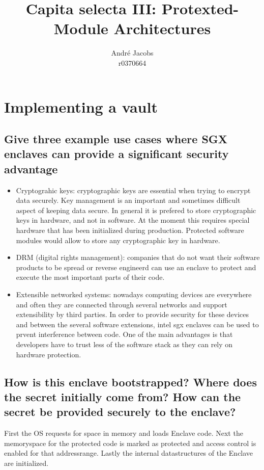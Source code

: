 \documentclass{article}
\begin{document}
\title{Capita selecta III: Protexted-Module Architectures} 
\author{André Jacobs\\ r0370664}
\date{}
\maketitle
\section{Implementing a vault}

\subsection{Give three example use cases where SGX enclaves can provide a significant
security advantage}

\begin{itemize}
  \item Cryptograhic keys: cryptographic keys are essential when trying to
    encrypt data securely. Key management is an important and sometimes
    difficult aspect of keeping data secure. In general it is prefered to store
    cryptographic keys in hardware, and not in software. At the moment this
    requires special hardware that has been initialized during production. Protected software
    modules would allow to store any cryptographic key in hardware.
  \item DRM (digital rights management): companies that do not want their
    software products to be spread or reverse engineerd can use an enclave to
    protect and execute the most important parts of their code. 
  \item Extensible networked systems: nowadays computing devices are everywhere
    and often they are connected through several networks and support
    extensibility by third parties. In order to provide security for these
    devices and between the several software extensions, intel sgx enclaves can
    be used to prvent interference between code. One of the main advantages is
    that developers have to trust less of the software stack as they can rely on
    hardware protection.
\end{itemize}

\subsection{How is this enclave bootstrapped?  Where does the secret initially come
from?  How can the secret be provided securely to the enclave?}
First the OS requests for space in memory and loads Enclave code. Next the memoryspace for the protected code is marked as protected
and access control is enabled for that addressrange. Lastly the internal
datastructures of the Enclave are initialized. 
\end{document}
